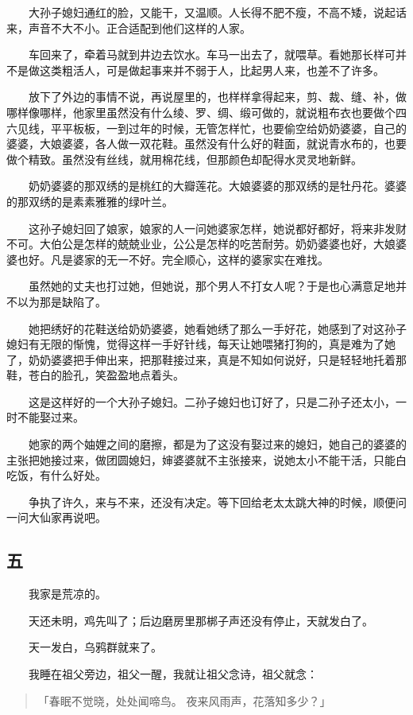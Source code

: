 \documentclass[UTF8]{ctexart}
\begin{document}
　　大孙子媳妇通红的脸，又能干，又温顺。人长得不肥不瘦，不高不矮，说起话来，声音不大不小。正合适配到他们这样的人家。

　　车回来了，牵着马就到井边去饮水。车马一出去了，就喂草。看她那长样可并不是做这类粗活人，可是做起事来并不弱于人，比起男人来，也差不了许多。

　　放下了外边的事情不说，再说屋里的，也样样拿得起来，剪、裁、缝、补，做哪样像哪样，他家里虽然没有什么绫、罗、绸、缎可做的，就说粗布衣也要做个四六见线，平平板板，一到过年的时候，无管怎样忙，也要偷空给奶奶婆婆，自己的婆婆，大娘婆婆，各人做一双花鞋。虽然没有什么好的鞋面，就说青水布的，也要做个精致。虽然没有丝线，就用棉花线，但那颜色却配得水灵灵地新鲜。

　　奶奶婆婆的那双绣的是桃红的大瓣莲花。大娘婆婆的那双绣的是牡丹花。婆婆的那双绣的是素素雅雅的绿叶兰。

　　这孙子媳妇回了娘家，娘家的人一问她婆家怎样，她说都好都好，将来非发财不可。大伯公是怎样的兢兢业业，公公是怎样的吃苦耐劳。奶奶婆婆也好，大娘婆婆也好。凡是婆家的无一不好。完全顺心，这样的婆家实在难找。

　　虽然她的丈夫也打过她，但她说，那个男人不打女人呢？于是也心满意足地并不以为那是缺陷了。

　　她把绣好的花鞋送给奶奶婆婆，她看她绣了那么一手好花，她感到了对这孙子媳妇有无限的惭愧，觉得这样一手好针线，每天让她喂猪打狗的，真是难为了她了，奶奶婆婆把手伸出来，把那鞋接过来，真是不知如何说好，只是轻轻地托着那鞋，苍白的脸孔，笑盈盈地点着头。

　　这是这样好的一个大孙子媳妇。二孙子媳妇也订好了，只是二孙子还太小，一时不能娶过来。

　　她家的两个妯娌之间的磨擦，都是为了这没有娶过来的媳妇，她自己的婆婆的主张把她接过来，做团圆媳妇，婶婆婆就不主张接来，说她太小不能干活，只能白吃饭，有什么好处。

　　争执了许久，来与不来，还没有决定。等下回给老太太跳大神的时候，顺便问一问大仙家再说吧。

\subsection{五}

　　我家是荒凉的。

　　天还未明，鸡先叫了；后边磨房里那梆子声还没有停止，天就发白了。

　　天一发白，乌鸦群就来了。

　　我睡在祖父旁边，祖父一醒，我就让祖父念诗，祖父就念：

\begin{verse}
    「春眠不觉晓，处处闻啼鸟。
    夜来风雨声，花落知多少？」
\end{verse}
\end{document}
